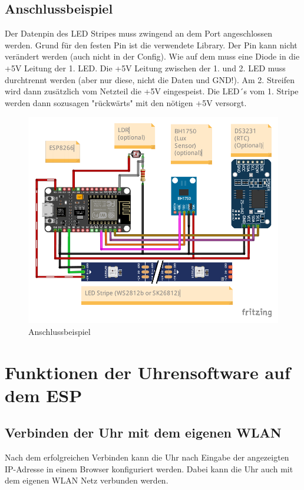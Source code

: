 \documentclass[12pt,a4paper, german,oneside, headinclude, headsepline,plainheadsepline,BCOR20mm, DIV18,parskip=half, openright, numbers=noenddot, captions=tableheading,version=first,listof=totoc,version=first]{scrbook}
\begin{document}
\section{Anschlussbeispiel}
Der Datenpin des LED Stripes muss zwingend an dem Port  angeschlossen werden. Grund für den festen Pin ist die verwendete Library. Der Pin kann nicht verändert werden (auch nicht in der Config). Wie auf dem muss eine Diode in die +5V Leitung der 1. LED. Die +5V Leitung zwischen der 1. und 2. LED muss durchtrennt werden (aber nur diese, nicht die Daten und GND!).
Am 2. Streifen wird dann zusätzlich vom Netzteil die +5V eingespeist. Die LED´s vom 1. Stripe werden dann sozusagen "rückwärts" mit den nötigen +5V versorgt.

    \begin{figure} [h]
		\centering
		\includegraphics[width=\linewidth]{Logos/Schematic.pdf} 
		\caption{Anschlussbeispiel}
		\label{abb.Schematic}
	\end{figure}

\chapter{Funktionen der Uhrensoftware auf dem ESP}

\section{Verbinden der Uhr mit dem eigenen WLAN}
Nach dem erfolgreichen Verbinden kann die Uhr nach Eingabe der angezeigten IP-Adresse in einem Browser konfiguriert werden. Dabei kann die Uhr auch mit dem eigenen WLAN Netz verbunden werden.
 
\end{document}
